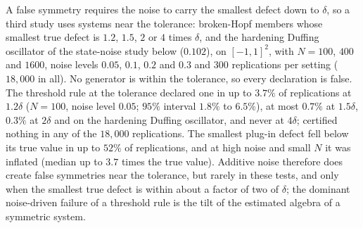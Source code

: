 A false symmetry requires the noise to carry the smallest defect down to
$\delta$, so a third study uses systems near the tolerance: broken-Hopf members
whose smallest true defect is $1.2$, $1.5$, $2$ or $4$ times $\delta$, and the
hardening Duffing oscillator of the state-noise study below ($0.102$), on
$[-1,1]^2$, with $N = 100$, $400$ and $1600$, noise levels $0.05$, $0.1$, $0.2$
and $0.3$ and $300$ replications per setting ($18{,}000$ in all). No generator
is within the tolerance, so every declaration is false. The threshold rule at
the tolerance declared one in up to $3.7\%$ of replications at $1.2\delta$ ($N
= 100$, noise level $0.05$; $95\%$ interval $1.8\%$ to $6.5\%$), at most
$0.7\%$ at $1.5\delta$, $0.3\%$ at $2\delta$ and on the hardening Duffing
oscillator, and never at $4\delta$; \symcert{} certified nothing in any of the
$18{,}000$ replications. The smallest plug-in defect fell below its true value
in up to $52\%$ of replications, and at high noise and small $N$ it was
inflated (median up to $3.7$ times the true value). Additive noise therefore
does create false symmetries near the tolerance, but rarely in these tests, and
only when the smallest true defect is within about a factor of two of $\delta$;
the dominant noise-driven failure of a threshold rule is the tilt of the
estimated algebra of a symmetric system.

